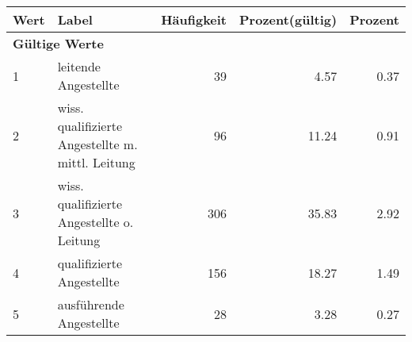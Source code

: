      \begin{longtable}{lXrrr}
     \toprule
     \textbf{Wert} & \textbf{Label} & \textbf{Häufigkeit} & \textbf{Prozent(gültig)} & \textbf{Prozent} \\
     \endhead
     \midrule
     \multicolumn{5}{l}{\textbf{Gültige Werte}}\\

     1 &
     \multicolumn{1}{X}{ leitende Angestellte   } &


       \num{39} &
       \num[round-mode=places,round-precision=2]{4.57} &
         \num[round-mode=places,round-precision=2]{0.37} \\

     2 &
     \multicolumn{1}{X}{ wiss. qualifizierte Angestellte m. mittl. Leitung   } &


       \num{96} &
       \num[round-mode=places,round-precision=2]{11.24} &
         \num[round-mode=places,round-precision=2]{0.91} \\

     3 &
     \multicolumn{1}{X}{ wiss. qualifizierte Angestellte o. Leitung   } &


       \num{306} &
       \num[round-mode=places,round-precision=2]{35.83} &
         \num[round-mode=places,round-precision=2]{2.92} \\

     4 &
     \multicolumn{1}{X}{ qualifizierte Angestellte   } &


       \num{156} &
       \num[round-mode=places,round-precision=2]{18.27} &
         \num[round-mode=places,round-precision=2]{1.49} \\

     5 &
     \multicolumn{1}{X}{ ausführende Angestellte   } &


       \num{28} &
       \num[round-mode=places,round-precision=2]{3.28} &
         \num[round-mode=places,round-precision=2]{0.27} \\


\end{longtable}
